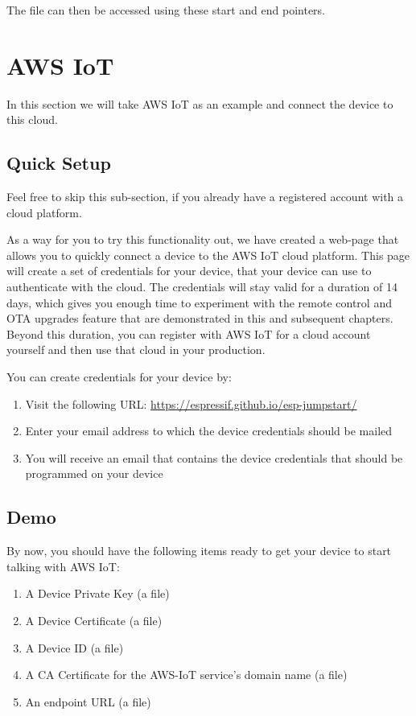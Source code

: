 \documentclass[main.tex]{subfiles}
\begin{document}
The file can then be accessed using these start and end pointers.

\section{AWS IoT}\label{sec:aws_cloud}
In this section we will take AWS IoT as an example and connect the device to this cloud. 

\subsection{Quick Setup}

Feel free to skip this sub-section, if you already have a registered account with a cloud platform.

As a way for you to try this functionality out, we have created a web-page that allows you to quickly connect a device to the AWS IoT cloud platform. This page will create a set of credentials for your device, that your device can use to authenticate with the cloud. The credentials will stay valid for a duration of 14 days, which gives you enough time to experiment with the remote control and OTA upgrades feature that are demonstrated in this and subsequent chapters. Beyond this duration, you can register with AWS IoT for a cloud account yourself and then use that cloud in your production.

You can create credentials for your device by:
\begin{enumerate}
   \item Visit the following URL: \url{https://espressif.github.io/esp-jumpstart/}
   \item Enter your email address to which the device credentials should be mailed
   \item You will receive an email that contains the device credentials that should be programmed on your device
\end{enumerate}

\subsection{Demo}
By now, you should have the following items ready to get your device to start talking with AWS IoT:
\begin{enumerate}
    \item A Device Private Key (a file)
    \item A Device Certificate (a file)
    \item A Device ID (a file)
    \item A CA Certificate for the AWS-IoT service's domain name (a file)
    \item An endpoint URL (a file)      
\end{enumerate}
\end{document}
